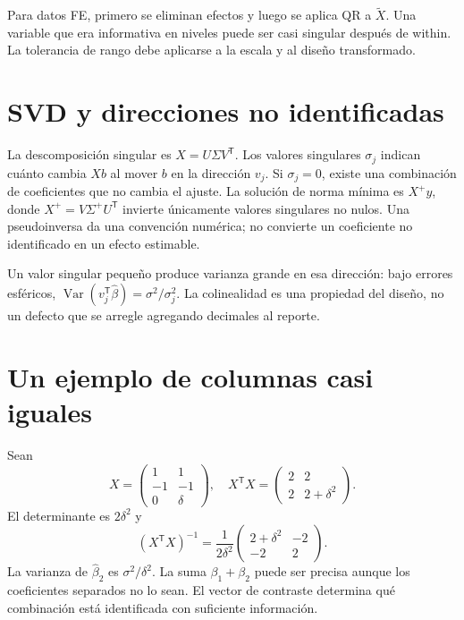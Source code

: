 \documentclass[11pt,a4paper]{article}
\newcommand{\T}{^{\mathsf T}}
\DeclareMathOperator{\Var}{Var}
\theoremstyle{definition}
\begin{document}
Para datos FE, primero se eliminan efectos y luego se aplica QR a $\widetilde X$.
Una variable que era informativa en niveles puede ser casi singular después de within.
La tolerancia de rango debe aplicarse a la escala y al diseño transformado.

\section{SVD y direcciones no identificadas}
La descomposición singular es
$X=U\Sigma V\T$.
Los valores singulares $\sigma_j$ indican cuánto cambia $Xb$ al mover $b$ en la dirección $v_j$.
Si $\sigma_j=0$, existe una combinación de coeficientes que no cambia el ajuste.
La solución de norma mínima es $X^+y$, donde
$X^+=V\Sigma^+U\T$ invierte únicamente valores singulares no nulos.
Una pseudoinversa da una convención numérica; no convierte un coeficiente no identificado en un efecto estimable.

Un valor singular pequeño produce varianza grande en esa dirección:
bajo errores esféricos,
$\Var(v_j\T\widehat\beta)=\sigma^2/\sigma_j^2$.
La colinealidad es una propiedad del diseño, no un defecto que se arregle agregando decimales al reporte.

\section{Un ejemplo de columnas casi iguales}
Sean
\[
X=\begin{pmatrix}1&1\\-1&-1\\0&\delta\end{pmatrix},
\quad
X\T X=\begin{pmatrix}2&2\\2&2+\delta^2\end{pmatrix}.
\]
El determinante es $2\delta^2$ y
\[
(X\T X)^{-1}
=\frac1{2\delta^2}
\begin{pmatrix}2+\delta^2&-2\\-2&2\end{pmatrix}.
\]
La varianza de $\widehat\beta_2$ es $\sigma^2/\delta^2$.
La suma $\beta_1+\beta_2$ puede ser precisa aunque los coeficientes separados no lo sean. El vector de contraste determina qué combinación está identificada con suficiente información.
\end{document}
